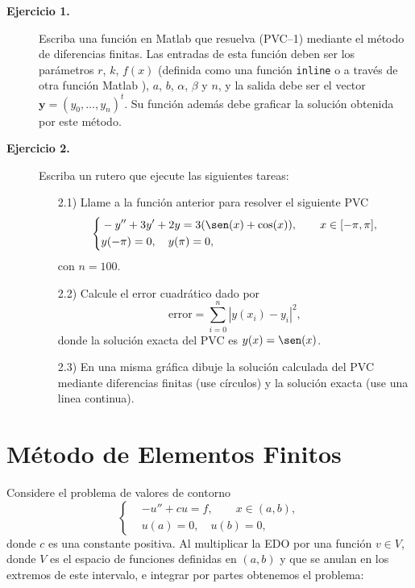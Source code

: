 \documentclass[letterpaper,11pt]{article}
\newcommand{\matlab}{{\sc Matlab} }
\begin{document}
\begin{description}
\item[\textbf{Ejercicio 1.}] Escriba una funci\'on en \matlab{} que resuelva (PVC--1) mediante el m\'etodo de diferencias finitas. Las entradas de esta funci\'on deben ser los par\'ametros $r$, $k$, $f(x)$ (definida como una funci\'on \verb"inline" o a trav\'es de otra funci\'on \matlab), $a$, $b$, $\alpha$, $\beta$ y $n$, y la salida debe ser el vector \break $\boldsymbol{y}=(y_0,\ldots,y_n)^t$. Su funci\'on adem\'as debe graficar la soluci\'on obtenida por este m\'etodo.\medskip
\item[\textbf{Ejercicio 2.}] Escriba un rutero que ejecute las siguientes tareas:
\begin{itemize}
\item[2.1)] Llame a la funci\'on anterior para resolver el siguiente PVC
$$
\left\{
\begin{aligned}
& -y''+3y'+2y=3(\sen(x)+\cos(x)),\qquad x\in[-\pi,\pi],\\
& y(-\pi)=0,\quad y(\pi)=0,
\end{aligned}
\right.
$$
con $n=100$.
\item[2.2)] Calcule el error cuadr\'atico dado por
$$
\text{error}=\sum_{i=0}^{n}|y(x_i)-y_i|^2,
$$
donde la soluci\'on exacta del PVC es $y(x)=\sen(x)$.
\item[2.3)] En una misma gr\'afica dibuje la soluci\'on calculada del PVC mediante diferencias finitas (use c\'irculos) y la soluci\'on exacta (use una linea continua).
\end{itemize}
\end{description}

\section{M\'etodo de Elementos Finitos}

Considere el problema de valores de contorno
\begin{equation}\tag{PVC--2}
\left\{
\begin{aligned}
& -u''+cu=f, \qquad x\in(a,b),\\
& u(a)=0,\quad u(b)=0,
\end{aligned}
\right.
\end{equation}
donde $c$ es una constante positiva. Al multiplicar la EDO por una funci\'on $v \in V$, donde $V$ es el espacio de funciones definidas en $(a,b)$ y que se anulan en los extremos de este intervalo, e integrar por partes obtenemos el problema: \medskip
\end{document}
